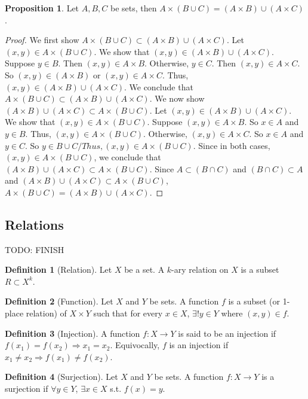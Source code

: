 \documentclass{article}
\theoremstyle{definition}
\newtheorem{define}{Definition}[subsection]
\newtheorem{prop}{Proposition}[subsection]
\begin{document}
\begin{prop}
Let $A, B, C$ be sets, then $A\times (B\cup C) = (A\times B)\cup (A\times C)$. 
\end{prop}
\begin{proof}
We first show $A\times (B\cup C) \subset (A\times B) \cup (A\times C)$. Let $(x,y) \in A \times (B\cup C)$. We show that $(x,y)\in (A\times B)\cup (A\times C)$. Suppose $y\in B$. Then $(x,y)\in A\times B$. Otherwise, $y\in C$. Then $(x,y)\in A\times C$. So $(x,y) \in (A\times B)$ or $(x,y)\in A\times C$. Thus, $(x,y)\in (A\times B) \cup (A\times C)$. We conclude that $A\times (B\cup C)\subset (A\times B)\cup (A\times C)$. We now show $(A\times B)\cup (A\times C) \subset A \times(B\cup C)$. Let $(x,y)\in (A \times B)\cup (A\times C)$. We show that $(x,y) \in A\times(B\cup C)$. Suppose $(x,y)\in A \times B$. So $x \in A$ and $y \in B$. Thus, $(x,y)\in A \times (B\cup C)$. Otherwise, $(x,y)\in A\times C$. So $x \in A$ and $y \in C$. So $y \in B\cup C/ Thus, (x,y)\in A\times(B\cup C)$. Since in both cases, $(x,y)\in A\times(B \cup C)$, we conclude that $(A\times B)\cup(A\times C)\subset A\times (B\cup C)$. Since $A \subset (B\cap C)$ and $(B\cap C)\subset A$ and $(A\times B)\cup(A\times C)\subset A\times (B\cup C)$, $A\times (B\cup C) = (A\times B)\cup (A\times C)$.
\end{proof}

\subsection{Relations}
TODO: FINISH

\begin{define}[Relation] 
Let $X$ be a set. A $k$-ary relation on $X$ is a subset $R \subset X^k$.
\end{define}

\begin{define}[Function]
Let $X$ and $Y$ be sets. A function $f$ is a subset (or 1-place relation) of $X \times Y$ such that for every $x \in X$, $\exists! y \in Y$ where $(x,y) \in f$.
\end{define}

\begin{define}[Injection] 
A function $f : X \to Y$ is said to be an injection if $f(x_1) = f(x_2) \Rightarrow x_1 = x_2$. Equivocally, $f$ is an injection if $x_1 \neq x_2 \Rightarrow f(x_1) \neq f(x_2)$.
\end{define}

\begin{define}[Surjection]
 Let $X$ and $Y$ be sets. A function $f : X \rightarrow Y$ is a surjection if $\forall y \in Y$, $\exists x \in X$ s.t. $f(x) = y$.
\end{define}
\end{document}

